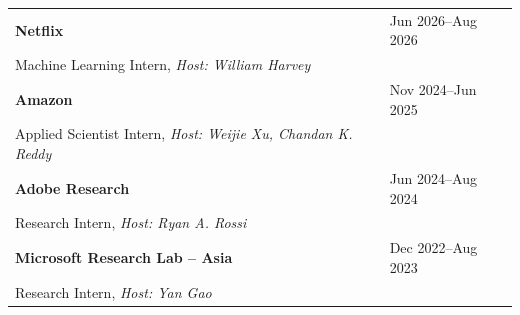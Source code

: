 \begin{longtable}[l]{@{}p{} >{\raggedleft\arraybackslash}p{}@{}}
    \textbf{Netflix} & Jun 2026--Aug 2026 \\
    Machine Learning Intern, \textit{Host: William Harvey} & \\[0.5em]
    \textbf{Amazon} & Nov 2024--Jun 2025 \\
    Applied Scientist Intern, \textit{Host: Weijie Xu, Chandan K. Reddy} & \\[0.5em]
    \textbf{Adobe Research} & Jun 2024--Aug 2024 \\
    Research Intern, \textit{Host: Ryan A. Rossi} & \\[0.5em]
    \textbf{Microsoft Research Lab -- Asia} & Dec 2022--Aug 2023 \\
    Research Intern, \textit{Host: Yan Gao} &
\end{longtable}
